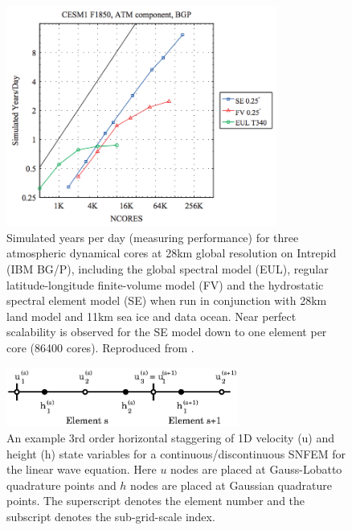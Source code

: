 \documentclass[11pt]{article}
\begin{document}
\begin{figure}[p]
\begin{center}
\includegraphics[width=3.5in, clip=true, trim=0cm 1.7cm 0cm 1.7cm]{CAMSEScalability.png}
\end{center}
\caption{Simulated years per day (measuring performance) for three atmospheric dynamical cores at 28km global resolution on Intrepid (IBM BG/P), including the global spectral model (EUL), regular latitude-longitude finite-volume model (FV) and the hydrostatic spectral element model (SE) when run in conjunction with 28km land model and 11km sea ice and data ocean.  Near perfect scalability is observed for the SE model down to one element per core (86400 cores).  Reproduced from \cite{dennis2011cam}.} \label{fig:CAMSEScalability}
\end{figure}

\begin{figure}[p]
\begin{center}
\includegraphics[width=3in]{SEStaggered}
\end{center}
\caption{An example 3rd order horizontal staggering of 1D velocity (u) and height (h) state variables for a continuous/discontinuous SNFEM for the linear wave equation.  Here $u$ nodes are placed at Gauss-Lobatto quadrature points and $h$ nodes are placed at Gaussian quadrature points.  The superscript denotes the element number and the subscript denotes the sub-grid-scale index.} \label{fig:SNFEM}
\end{figure}
\end{document}
